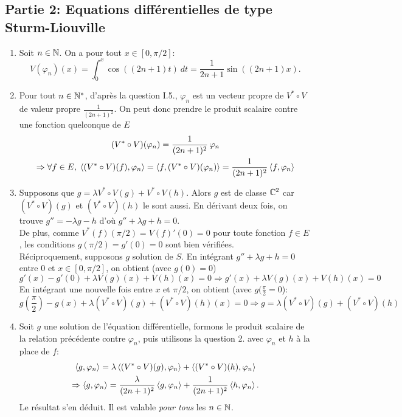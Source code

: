 \subsection*{Partie 2: Equations différentielles de type Sturm-Liouville}
\begin{enumerate}

\item Soit $n\in \mathbb{N}$. On a pour tout $x\in [0,\pi /2]$:
$$V(\varphi_{n})(x) = \int_{0}^{x}\cos((2n+1)t)\ dt = \frac{1}{2n+1}\sin ((2n+1)x).$$

\item Pour tout $n\in \mathbb{N}^{*}$, d'après la question I.5., $\varphi_n$ est un vecteur propre de $V^*\circ V$ de valeur propre $\frac{1}{(2n+1)^2}$. On peut donc prendre le produit scalaire contre une fonction quelconque de $E$
\begin{multline*}
(V^*\circ V)(\varphi_n) = \frac{1}{(2n+1)^2}\, \varphi_n \\
\Rightarrow \forall f\in E,\;
\left\langle {(V^{*}\circ V)(f)} , {\varphi_{n}} \right\rangle  = \left\langle {f} , {(V^{*}\circ V)(\varphi_{n})} \right\rangle  = \frac{1}{(2n+1)^2}\left\langle {f} , {\varphi_n} \right\rangle
\end{multline*}

\item Supposons que $g = \lambda V^{*}\circ V(g) + V^{*}\circ V(h)$. Alors $g$ est de classe $\mathbb{C}^{2}$ car $(V^{*}\circ V)(g)$ et $(V^{*}\circ V)(h)$ le sont aussi. En dérivant deux fois, on trouve $g'' = -\lambda g - h$ d'où $g'' +\lambda g + h = 0$. \\
De plus, comme $V^{*}(f)(\pi /2) = V(f)'(0) = 0$ pour toute fonction $f\in E$, les conditions $g(\pi/2) = g'(0) = 0$ sont bien vérifiées. \\
Réciproquement, supposons $g$ solution de $S$. En intégrant $g''+\lambda g + h = 0$ entre $0$ et $x\in [0,\pi /2]$, on obtient (avec $g(0)=0$)
\begin{displaymath}
g'(x)-g'(0) +\lambda V(g)(x) + V(h)(x) = 0 \Rightarrow  g'(x) + \lambda V(g)(x) + V(h)(x) = 0
\end{displaymath}
En intégrant une nouvelle fois entre $x$ et $\pi /2$, on obtient (avec $g(\frac{\pi}{2}=0$):
\begin{displaymath}
g(\frac{\pi}{2})-g(x) + \lambda (V^{*}\circ V)(g) + (V^{*}\circ V)(h)(x) = 0
\Rightarrow
g = \lambda (V^{*}\circ V)(g) + (V^{*}\circ V)(h)
\end{displaymath}

\item Soit $g$ une solution de l'équation différentielle, formons le produit scalaire de la relation précédente contre $\varphi_n$, puis utilisons la question 2. avec $\varphi_n$ et $h$ à la place de $f$:
\begin{multline*}
\left\langle {g} , {\varphi_{n}} \right\rangle = \lambda \left\langle {(V^{*}\circ V)(g)} , {\varphi_{n}} \right\rangle + \left\langle {(V^{*}\circ V)(h)} , {\varphi_{n}} \right\rangle\\
\Rightarrow
\left\langle {g} , {\varphi_{n}} \right\rangle = \frac{\lambda}{(2n+1)^{2}}\left\langle {g} , {\varphi_{n}} \right\rangle + 
\frac{1}{(2n+1)^{2}}\left\langle {h} , {\varphi_{n}} \right\rangle.
\end{multline*}
Le résultat s'en déduit. Il est valable \emph{pour tous} les $n\in \mathbb{N}$.


\end{enumerate}
